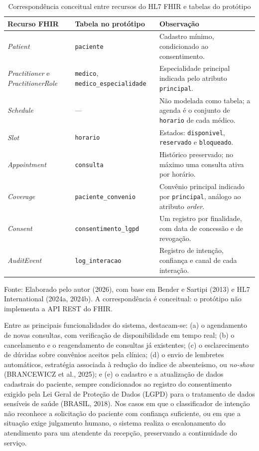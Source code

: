\documentclass[12pt,a4paper]{extarticle}
\begin{document}
\begin{table}[H]
\centering
\caption{Correspondência conceitual entre recursos do HL7 FHIR e tabelas do protótipo}
\label{tab:fhir-correspondencia}
\small
\begin{tabularx}{\textwidth}{p{3.4cm}p{4.4cm}Y}
\hline
\textbf{Recurso FHIR} & \textbf{Tabela no protótipo} & \textbf{Observação} \\
\hline
\textit{Patient} & \texttt{paciente} & Cadastro mínimo, condicionado ao consentimento. \\
\textit{Practitioner} e \textit{PractitionerRole} & \texttt{medico}, \texttt{medico\_\allowbreak{}especialidade} & Especialidade principal indicada pelo atributo \texttt{principal}. \\
\textit{Schedule} & --- & Não modelada como tabela; a agenda é o conjunto de \texttt{horario} de cada médico. \\
\textit{Slot} & \texttt{horario} & Estados: \texttt{disponivel}, \texttt{reservado} e \texttt{bloqueado}. \\
\textit{Appointment} & \texttt{consulta} & Histórico preservado; no máximo uma consulta ativa por horário. \\
\textit{Coverage} & \texttt{paciente\_\allowbreak{}convenio} & Convênio principal indicado por \texttt{principal}, análogo ao atributo \textit{order}. \\
\textit{Consent} & \texttt{consentimento\_\allowbreak{}lgpd} & Um registro por finalidade, com data de concessão e de revogação. \\
\textit{AuditEvent} & \texttt{log\_\allowbreak{}interacao} & Registro de intenção, confiança e canal de cada interação. \\
\hline
\end{tabularx}
\vspace{0.3cm}

\footnotesize{Fonte: Elaborado pelo autor (2026), com base em Bender e Sartipi (2013) e HL7 International (2024a, 2024b). A correspondência é conceitual: o protótipo não implementa a API REST do FHIR.}
\end{table}


Entre as principais funcionalidades do sistema, destacam-se: (a) o agendamento de novas consultas, com verificação de disponibilidade em tempo real; (b) o cancelamento e o reagendamento de consultas já existentes; (c) o esclarecimento de dúvidas sobre convênios aceitos pela clínica; (d) o envio de lembretes automáticos, estratégia associada à redução do índice de absenteísmo, ou \textit{no-show} (BRANCEWICZ et al., 2025); e (e) o cadastro e a atualização de dados cadastrais do paciente, sempre condicionados ao registro do consentimento exigido pela Lei Geral de Proteção de Dados (LGPD) para o tratamento de dados sensíveis de saúde (BRASIL, 2018). Nos casos em que o classificador de intenção não reconhece a solicitação do paciente com confiança suficiente, ou em que a situação exige julgamento humano, o sistema realiza o escalonamento do atendimento para um atendente da recepção, preservando a continuidade do serviço.
\end{document}
